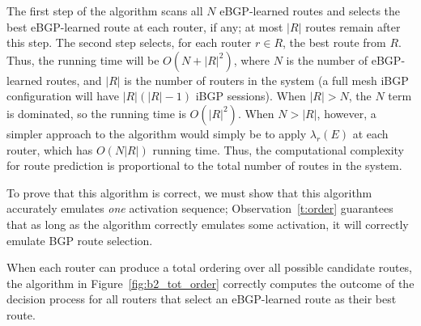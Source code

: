The first step of the algorithm scans all $N$ eBGP-learned routes and
selects the best eBGP-learned route at each router, if any; at most
$|R|$ routes remain after this step.  The second step selects, for each
router $r \in R$, the best route from $R$.  Thus, the running time will
be $O(N + |R|^2)$, where $N$ is the number of eBGP-learned routes, and
$|R|$ is the number of routers in the system (a full mesh iBGP
configuration will have $|R|(|R|-1)$ iBGP sessions).  When $|R|>N$, the
$N$ term is dominated, so the running time is $O(|R|^2)$.  When $N>|R|$,
however, a simpler approach to the algorithm would simply be to apply
$\lambda_r(E)$ at each router, which has $O(N|R|)$ running time.  Thus,
the computational complexity for route prediction is proportional to the
total number of routes in the system.

To prove that this algorithm is correct, we must show that this
algorithm accurately emulates {\em one} activation sequence;
Observation~\ref{t:order} guarantees that as long as the algorithm
correctly emulates some activation, it will correctly emulate BGP
route selection. 

\begin{theorem}\label{t:ebgp_to}
When each router can produce a total ordering over all possible
candidate routes, the algorithm in Figure~\ref{fig:b2_tot_order}
correctly computes the outcome of the decision process 
for all routers that select an eBGP-learned route as their best
route.
\end{theorem}

